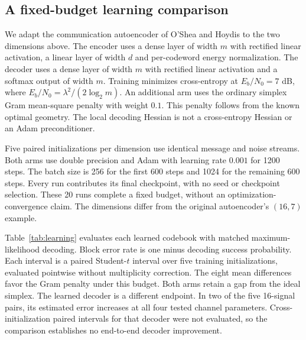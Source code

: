 \documentclass[11pt]{article}
\theoremstyle{remark}\newtheorem{remark}[theorem]{Remark}
\begin{document}
\subsection{A fixed-budget learning comparison}
We adapt the communication autoencoder of O'Shea and Hoydis
\cite[Section III-A and Table IV]{OSheaHoydis} to the two dimensions above.
The encoder uses a dense layer of width $m$ with rectified linear activation,
a linear layer of width $d$ and per-codeword energy normalization.
The decoder uses a dense layer of width $m$ with rectified linear activation
and a softmax output of width $m$.
Training minimizes cross-entropy at $E_b/N_0=7$ dB, where
$E_b/N_0=\lambda^2/(2\log_2m)$.
An additional arm uses the ordinary simplex Gram mean-square penalty with
weight $0.1$. This penalty follows from the known optimal geometry.
The local decoding Hessian is not a cross-entropy Hessian or an Adam preconditioner.

Five paired initializations per dimension use identical message and noise streams.
Both arms use double precision and Adam with learning rate $0.001$ for 1200 steps.
The batch size is 256 for the first 600 steps and 1024 for the remaining 600 steps.
Every run contributes its final checkpoint, with no seed or checkpoint selection.
These 20 runs complete a fixed budget, without an optimization-convergence claim.
The dimensions differ from the original autoencoder's $(16,7)$ example.

Table~\ref{tab:learning} evaluates each learned codebook with matched
maximum-likelihood decoding. Block error rate is one minus decoding success
probability. Each interval is a paired Student-$t$ interval over five training
initializations, evaluated pointwise without multiplicity correction.
The eight mean differences favor the Gram penalty under this budget.
Both arms retain a gap from the ideal simplex.
The learned decoder is a different endpoint. In two of the five 16-signal pairs,
its estimated error increases at all four tested channel parameters.
Cross-initialization paired intervals for that decoder were not evaluated,
so the comparison establishes no end-to-end decoder improvement.
\end{document}

